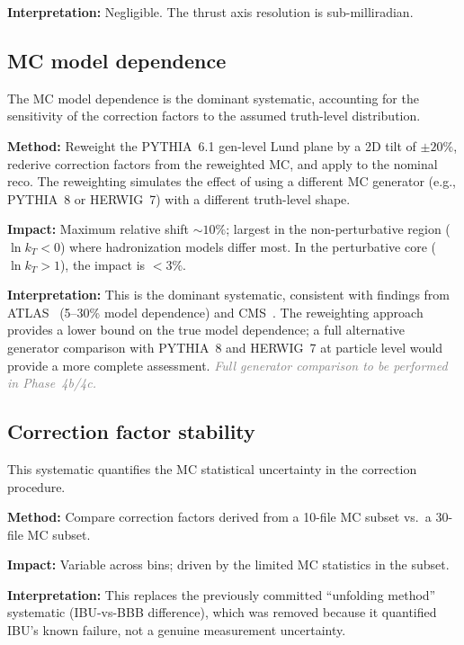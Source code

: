 \documentclass[11pt,a4paper]{article}
\newcommand{\tbd}[1]{\textcolor{gray}{\textit{#1}}}
\begin{document}
\textbf{Interpretation:} Negligible.  The thrust axis resolution
is sub-milliradian.

\subsection{MC model dependence}
\label{sec:syst-model}

The MC model dependence is the dominant systematic, accounting for
the sensitivity of the correction factors to the assumed truth-level
distribution.

\textbf{Method:} Reweight the PYTHIA~6.1 gen-level Lund plane by a
2D tilt of $\pm 20\%$, rederive correction factors from the reweighted
MC, and apply to the nominal reco.  The reweighting simulates the
effect of using a different MC generator (e.g., PYTHIA~8 or
HERWIG~7) with a different truth-level shape.

\textbf{Impact:} Maximum relative shift $\sim\!10\%$; largest in the
non-perturbative region ($\ln k_T < 0$) where hadronization models
differ most.  In the perturbative core ($\ln k_T > 1$), the impact
is $<\!3\%$.

\textbf{Interpretation:} This is the dominant systematic, consistent
with findings from ATLAS~\cite{ATLAS:2020bbn} (5--30\% model
dependence) and CMS~\cite{CMS:2024mlf}.  The reweighting approach
provides a lower bound on the true model dependence; a full alternative
generator comparison with PYTHIA~8 and HERWIG~7 at particle level would
provide a more complete assessment.  \tbd{Full generator comparison
to be performed in Phase~4b/4c.}

\subsection{Correction factor stability}
\label{sec:syst-corr-stability}

This systematic quantifies the MC statistical uncertainty in the
correction procedure.

\textbf{Method:} Compare correction factors derived from a 10-file MC
subset vs.\ a 30-file MC subset.

\textbf{Impact:} Variable across bins; driven by the limited MC
statistics in the subset.

\textbf{Interpretation:} This replaces the previously committed
``unfolding method'' systematic (IBU-vs-BBB difference), which was
removed because it quantified IBU's known failure, not a genuine
measurement uncertainty.
\end{document}
